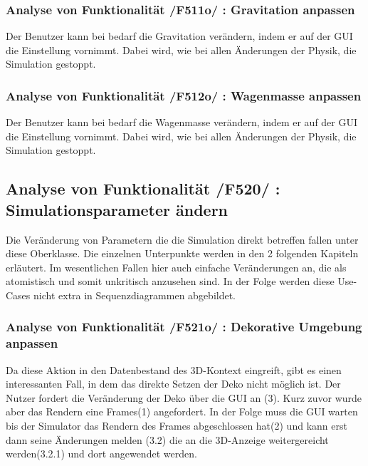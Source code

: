 \subsubsection{Analyse von Funktionalität /F511o/ :  Gravitation anpassen}
Der Benutzer kann bei bedarf die Gravitation verändern, indem er auf der GUI die Einstellung vornimmt. Dabei wird, wie bei allen Änderungen der Physik, die Simulation gestoppt.
\subsubsection{Analyse von Funktionalität /F512o/ :  Wagenmasse anpassen}
Der Benutzer kann bei bedarf die Wagenmasse verändern, indem er auf der GUI die Einstellung vornimmt. Dabei wird, wie bei allen Änderungen der Physik, die Simulation gestoppt.
\subsection{Analyse von Funktionalität /F520/ :  Simulationsparameter ändern}
Die Veränderung von Parametern die die Simulation direkt betreffen fallen unter diese Oberklasse. Die einzelnen Unterpunkte werden in den 2 folgenden Kapiteln erläutert. Im wesentlichen Fallen hier 
auch einfache Veränderungen an, die als atomistisch und somit unkritisch anzusehen sind. In der Folge werden diese Use-Cases nicht extra in Sequenzdiagrammen abgebildet.
\subsubsection{Analyse von Funktionalität /F521o/ :  Dekorative Umgebung anpassen}
Da diese Aktion in den Datenbestand des 3D-Kontext eingreift, gibt es einen interessanten Fall, in dem das direkte Setzen der Deko nicht möglich ist. 
Der Nutzer fordert die Veränderung der Deko über die GUI an (3). Kurz zuvor wurde aber das Rendern eine Frames(1) angefordert. 
In der Folge muss die GUI warten bis der Simulator das Rendern des Frames abgeschlossen hat(2) und kann erst dann seine Änderungen melden (3.2) die an die 3D-Anzeige weitergereicht werden(3.2.1) und dort angewendet werden.

